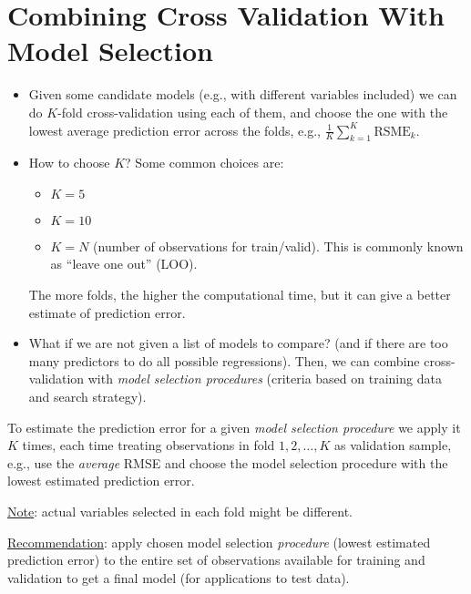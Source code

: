 \section{Combining Cross Validation With Model Selection}
\begin{itemize}
    \item Given some candidate models (e.g., with different
          variables included) we can do $ K $-fold
          cross-validation using each of them, and choose the one
          with the lowest average prediction error across
          the folds, e.g., $ \displaystyle
              \frac{1}{K} \sum_{k=1}^{K} \text{RSME}_k $.
    \item How to choose $ K $? Some common choices are:
          \begin{itemize}
              \item $ K=5 $
              \item $ K=10 $
              \item $ K=N $ (number of observations for train/valid).
                    This is commonly known as ``leave one out'' (LOO).
          \end{itemize}
          The more folds, the higher the computational time, but
          it can give a better estimate of prediction error.
    \item What if we are not given a list of models to compare?
          (and if there are too many predictors to do all possible
          regressions). Then, we can combine cross-validation with
          \emph{model selection procedures} (criteria based on training
          data and search strategy).
\end{itemize}
To estimate the prediction error for a given
\emph{model selection procedure} we apply it $ K $ times,
each time treating observations in fold $ 1,2,\ldots,K $
as validation sample, e.g., use the \emph{average}
RMSE and choose the model selection procedure
with the lowest estimated prediction error.

\underline{Note}: actual variables selected in each fold might
be different.

\underline{Recommendation}: apply chosen
model selection \emph{procedure} (lowest estimated prediction error)
to the entire set of observations available for training
and validation to get a final model (for applications
to test data).

